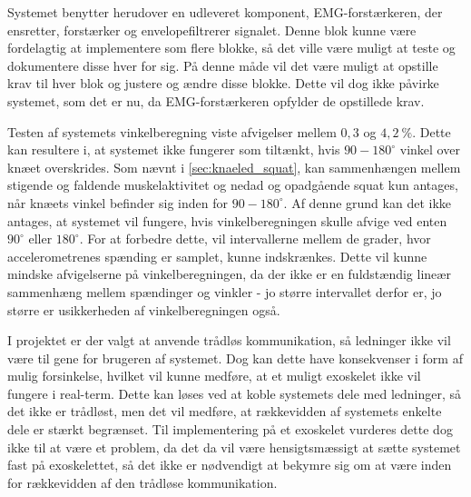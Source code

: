 Systemet benytter herudover en udleveret komponent, EMG-forstærkeren, der ensretter, forstærker og envelopefiltrerer signalet. Denne blok kunne være fordelagtig at implementere som flere blokke, så det ville være muligt at teste og dokumentere disse hver for sig. På denne måde vil det være muligt at opstille krav til hver blok og justere og ændre disse blokke. Dette vil dog ikke påvirke systemet, som det er nu, da EMG-forstærkeren opfylder de opstillede krav. %

Testen af systemets vinkelberegning viste afvigelser mellem $0,3$ og $4,2~\%$. Dette kan resultere i, at systemet ikke fungerer som tiltænkt, hvis $90-180^{\circ}$ vinkel over knæet overskrides. Som nævnt i \autoref{sec:knaeled_squat}, kan sammenhængen mellem stigende og faldende muskelaktivitet og nedad og opadgående squat kun antages, når knæets vinkel befinder sig inden for $90-180^{\circ}$. Af denne grund kan det ikke antages, at systemet vil fungere, hvis vinkelberegningen skulle afvige ved enten $90^{\circ}$ eller $180^{\circ}$. For at forbedre dette, vil intervallerne mellem de grader, hvor accelerometrenes spænding er samplet, kunne indskrænkes. Dette vil kunne mindske afvigelserne på vinkelberegningen, da der ikke er en fuldstændig lineær sammenhæng mellem spændinger og vinkler - jo større intervallet derfor er, jo større er usikkerheden af vinkelberegningen også.

I projektet er der valgt at anvende trådløs kommunikation, så ledninger ikke vil være til gene for brugeren af systemet. Dog kan dette have konsekvenser i form af mulig forsinkelse, hvilket vil kunne medføre, at et muligt exoskelet ikke vil fungere i real-term. Dette kan løses ved at koble systemets dele med ledninger, så det ikke er trådløst, men det vil medføre, at rækkevidden af systemets enkelte dele er stærkt begrænset. Til implementering på et exoskelet vurderes dette dog ikke til at være et problem, da det da vil være hensigtsmæssigt at sætte systemet fast på exoskelettet, så det ikke er nødvendigt at bekymre sig om at være inden for rækkevidden af den trådløse kommunikation.




